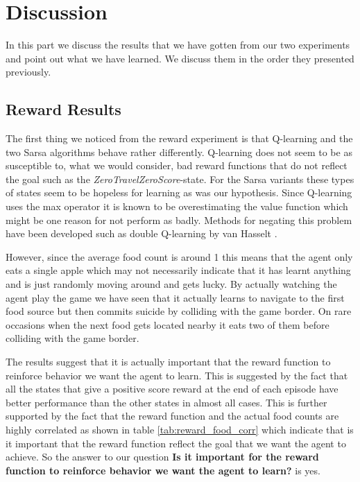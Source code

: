 \documentclass[result.tex]{subfiles}
\begin{document}
    \section*{\centering Discussion}

    In this part we discuss the results that we have gotten from our two experiments and point out what we have learned. We discuss them in the order they presented previously.

    \subsection*{Reward Results}

    The first thing we noticed from the reward experiment is that Q-learning and the two Sarsa algorithms behave rather differently. Q-learning does not seem to be as susceptible to, what we would consider, bad reward functions that do not reflect the goal such as the \textit{ZeroTravelZeroScore}-state. For the Sarsa variants these types of states seem to be hopeless for learning as was our hypothesis. Since Q-learning uses the max operator it is known to be overestimating the value function which might be one reason for not perform as badly. Methods for negating this problem have been developed such as double Q-learning by van Hasselt \cite{hasselt2010double}.

    However, since the average food count is around 1 this means that the agent only eats a single apple which may not necessarily indicate that it has learnt anything and is just randomly moving around and gets lucky. By actually watching the agent play the game we have seen that it actually learns to navigate to the first food source but then commits suicide by colliding with the game border. On rare occasions when the next food gets located nearby it eats two of them before colliding with the game border.

    The results suggest that it is actually important that the reward function to reinforce behavior we want the agent to learn. This is suggested by the fact that all the states that give a positive score reward at the end of each episode have better performance than the other states in almost all cases. This is further supported by the fact that the reward function and the actual food counts are highly correlated as shown in table \ref{tab:reward_food_corr} which indicate that is it important that the reward function reflect the goal that we want the agent to achieve. So the answer to our question \textbf{Is it important for the reward function to reinforce behavior we
    want the agent to learn?} is yes.
\end{document}
